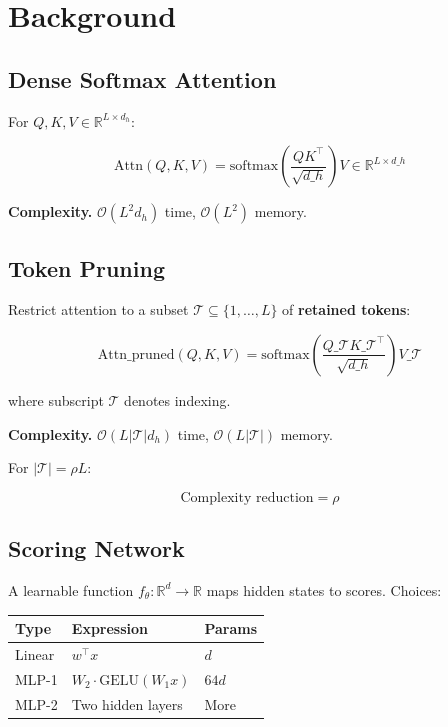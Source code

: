 
\section{Background}

\subsection{Dense Softmax Attention}

For $Q, K, V \in \mathbb{R}^{L \times d_h}$:

\[
\text{Attn}(Q, K, V) = \text{softmax}\!\left(\frac{Q K^\top}{\sqrt{d\_h}}\right) V \in \mathbb{R}^{L \times d\_h}
\tag{3.1}
\]

\textbf{Complexity.} $\mathcal{O}(L^2 d_h)$ time, $\mathcal{O}(L^2)$ memory.

\subsection{Token Pruning}

Restrict attention to a subset $\mathcal{T} \subseteq \{1, \dots, L\}$ 
of \textbf{retained tokens}:

\[
\text{Attn}\_\text{pruned}(Q, K, V) = \text{softmax}\!\left(\frac{Q\_\mathcal{T} K\_\mathcal{T}^\top}{\sqrt{d\_h}}\right) V\_\mathcal{T}
\tag{3.2}
\]

where subscript $\mathcal{T}$ denotes indexing.

\textbf{Complexity.} $\mathcal{O}(L |\mathcal{T}| d_h)$ time, $\mathcal{O}(L |\mathcal{T}|)$ memory.

For $|\mathcal{T}| = \rho L$:

\[
\text{Complexity reduction} = \rho
\tag{3.3}
\]

\subsection{Scoring Network}

A learnable function $f_\theta: \mathbb{R}^d \to \mathbb{R}$ maps hidden 
states to scores. Choices:

\begin{table}[H]
\centering
\small
\begin{tabular}{lll}
\toprule
\textbf{Type} & \textbf{Expression} & \textbf{Params} \\
\midrule
Linear & $w^\top x$ & $d$ \\
MLP-1 & $W_2 \cdot \text{GELU}(W_1 x)$ & $64 d$ \\
MLP-2 & Two hidden layers & More \\
\bottomrule
\end{tabular}
\end{table}


